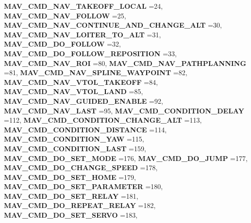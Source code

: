 \begin{DoxyCompactItemize}
\textbf{ M\+A\+V\+\_\+\+C\+M\+D\+\_\+\+N\+A\+V\+\_\+\+T\+A\+K\+E\+O\+F\+F\+\_\+\+L\+O\+C\+AL} =24, 
\textbf{ M\+A\+V\+\_\+\+C\+M\+D\+\_\+\+N\+A\+V\+\_\+\+F\+O\+L\+L\+OW} =25, 
\newline
\textbf{ M\+A\+V\+\_\+\+C\+M\+D\+\_\+\+N\+A\+V\+\_\+\+C\+O\+N\+T\+I\+N\+U\+E\+\_\+\+A\+N\+D\+\_\+\+C\+H\+A\+N\+G\+E\+\_\+\+A\+LT} =30, 
\textbf{ M\+A\+V\+\_\+\+C\+M\+D\+\_\+\+N\+A\+V\+\_\+\+L\+O\+I\+T\+E\+R\+\_\+\+T\+O\+\_\+\+A\+LT} =31, 
\textbf{ M\+A\+V\+\_\+\+C\+M\+D\+\_\+\+D\+O\+\_\+\+F\+O\+L\+L\+OW} =32, 
\textbf{ M\+A\+V\+\_\+\+C\+M\+D\+\_\+\+D\+O\+\_\+\+F\+O\+L\+L\+O\+W\+\_\+\+R\+E\+P\+O\+S\+I\+T\+I\+ON} =33, 
\newline
\textbf{ M\+A\+V\+\_\+\+C\+M\+D\+\_\+\+N\+A\+V\+\_\+\+R\+OI} =80, 
\textbf{ M\+A\+V\+\_\+\+C\+M\+D\+\_\+\+N\+A\+V\+\_\+\+P\+A\+T\+H\+P\+L\+A\+N\+N\+I\+NG} =81, 
\textbf{ M\+A\+V\+\_\+\+C\+M\+D\+\_\+\+N\+A\+V\+\_\+\+S\+P\+L\+I\+N\+E\+\_\+\+W\+A\+Y\+P\+O\+I\+NT} =82, 
\textbf{ M\+A\+V\+\_\+\+C\+M\+D\+\_\+\+N\+A\+V\+\_\+\+V\+T\+O\+L\+\_\+\+T\+A\+K\+E\+O\+FF} =84, 
\newline
\textbf{ M\+A\+V\+\_\+\+C\+M\+D\+\_\+\+N\+A\+V\+\_\+\+V\+T\+O\+L\+\_\+\+L\+A\+ND} =85, 
\textbf{ M\+A\+V\+\_\+\+C\+M\+D\+\_\+\+N\+A\+V\+\_\+\+G\+U\+I\+D\+E\+D\+\_\+\+E\+N\+A\+B\+LE} =92, 
\textbf{ M\+A\+V\+\_\+\+C\+M\+D\+\_\+\+N\+A\+V\+\_\+\+L\+A\+ST} =95, 
\textbf{ M\+A\+V\+\_\+\+C\+M\+D\+\_\+\+C\+O\+N\+D\+I\+T\+I\+O\+N\+\_\+\+D\+E\+L\+AY} =112, 
\newline
\textbf{ M\+A\+V\+\_\+\+C\+M\+D\+\_\+\+C\+O\+N\+D\+I\+T\+I\+O\+N\+\_\+\+C\+H\+A\+N\+G\+E\+\_\+\+A\+LT} =113, 
\textbf{ M\+A\+V\+\_\+\+C\+M\+D\+\_\+\+C\+O\+N\+D\+I\+T\+I\+O\+N\+\_\+\+D\+I\+S\+T\+A\+N\+CE} =114, 
\textbf{ M\+A\+V\+\_\+\+C\+M\+D\+\_\+\+C\+O\+N\+D\+I\+T\+I\+O\+N\+\_\+\+Y\+AW} =115, 
\textbf{ M\+A\+V\+\_\+\+C\+M\+D\+\_\+\+C\+O\+N\+D\+I\+T\+I\+O\+N\+\_\+\+L\+A\+ST} =159, 
\newline
\textbf{ M\+A\+V\+\_\+\+C\+M\+D\+\_\+\+D\+O\+\_\+\+S\+E\+T\+\_\+\+M\+O\+DE} =176, 
\textbf{ M\+A\+V\+\_\+\+C\+M\+D\+\_\+\+D\+O\+\_\+\+J\+U\+MP} =177, 
\textbf{ M\+A\+V\+\_\+\+C\+M\+D\+\_\+\+D\+O\+\_\+\+C\+H\+A\+N\+G\+E\+\_\+\+S\+P\+E\+ED} =178, 
\textbf{ M\+A\+V\+\_\+\+C\+M\+D\+\_\+\+D\+O\+\_\+\+S\+E\+T\+\_\+\+H\+O\+ME} =179, 
\newline
\textbf{ M\+A\+V\+\_\+\+C\+M\+D\+\_\+\+D\+O\+\_\+\+S\+E\+T\+\_\+\+P\+A\+R\+A\+M\+E\+T\+ER} =180, 
\textbf{ M\+A\+V\+\_\+\+C\+M\+D\+\_\+\+D\+O\+\_\+\+S\+E\+T\+\_\+\+R\+E\+L\+AY} =181, 
\textbf{ M\+A\+V\+\_\+\+C\+M\+D\+\_\+\+D\+O\+\_\+\+R\+E\+P\+E\+A\+T\+\_\+\+R\+E\+L\+AY} =182, 
\textbf{ M\+A\+V\+\_\+\+C\+M\+D\+\_\+\+D\+O\+\_\+\+S\+E\+T\+\_\+\+S\+E\+R\+VO} =183, 

\end{DoxyCompactItemize}
